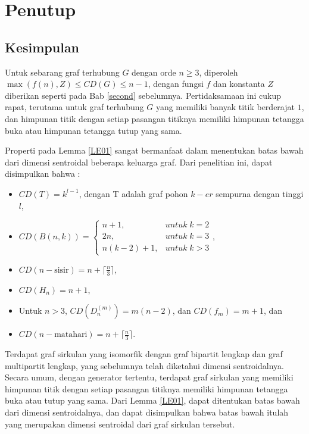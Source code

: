 \chapter{Penutup}
\pagestyle{fancy}
\fancyhead[R]{}
\fancyfoot[C]{\thepage}
\onehalfspacing

\section{Kesimpulan}
Untuk sebarang graf terhubung $G$ dengan orde $n\ge 3$, diperoleh $\max(f(n),Z)\le CD(G)\le n-1$, dengan fungsi $f$ dan konstanta $Z$ diberikan seperti pada Bab \ref{second} sebelumnya. Pertidaksamaan ini cukup rapat, terutama untuk graf terhubung $G$ yang memiliki banyak titik berderajat $1$, dan himpunan titik dengan setiap pasangan titiknya memiliki himpunan tetangga buka atau himpunan tetangga tutup yang sama.

Properti pada Lemma \ref{LE01} sangat bermanfaat dalam menentukan batas bawah dari dimensi sentroidal beberapa keluarga graf. Dari penelitian ini, dapat disimpulkan bahwa : 
\begin{itemize}
	\item $CD(T)=k^{l-1}$, dengan T adalah graf pohon $k-er$ sempurna dengan tinggi $l$,
	\item $CD(B(n,k))=\begin{cases}
	n+1, & untuk\;k=2\\
	2n, & untuk\;k=3\\
	n(k-2)+1, & untuk\;k>3
	\end{cases}$,
	\item $CD(n-\text{sisir})=n+\lceil\frac{n}{3}\rceil$,
	\item $CD(H_n)=n+1$,
	\item Untuk $n>3$, $CD(D_n^{(m)})=m(n-2)$, dan $CD(f_m)=m+1$, dan
	\item $CD(n-\text{matahari})=n+\lceil\frac{n}{3}\rceil$.
\end{itemize}

Terdapat graf sirkulan yang isomorfik dengan graf bipartit lengkap dan graf multipartit lengkap, yang sebelumnya telah diketahui dimensi sentroidalnya. Secara umum, dengan generator tertentu, terdapat graf sirkulan yang memiliki himpunan titik dengan setiap pasangan titiknya memiliki himpunan tetangga buka atau tutup yang sama. Dari Lemma \ref{LE01}, dapat ditentukan batas bawah dari dimensi sentroidalnya, dan dapat disimpulkan bahwa batas bawah itulah yang merupakan dimensi sentroidal dari graf sirkulan tersebut.

